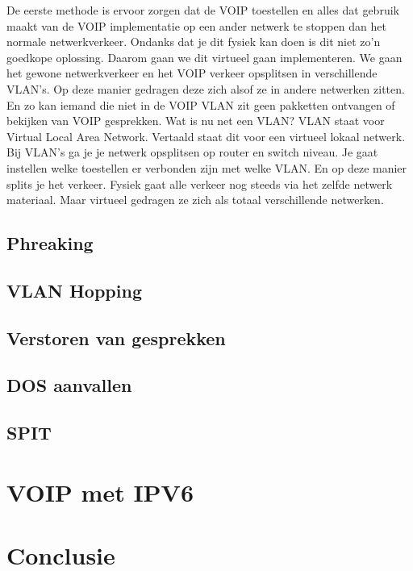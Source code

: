 \documentclass[pdftex,a4paper,12pt,twoside]{report}
\begin{document}
De eerste methode is ervoor zorgen dat de VOIP toestellen en alles dat gebruik maakt van de VOIP implementatie op een ander netwerk te stoppen dan het normale netwerkverkeer. Ondanks dat je dit fysiek kan doen is dit niet zo’n goedkope oplossing. Daarom gaan we dit virtueel gaan implementeren. We gaan het gewone netwerkverkeer en het VOIP verkeer opsplitsen in verschillende VLAN’s. Op deze manier gedragen deze zich alsof ze in andere netwerken zitten. En zo kan iemand die niet in de VOIP VLAN zit geen pakketten ontvangen of bekijken van VOIP gesprekken.
Wat is nu net een VLAN? VLAN staat voor Virtual Local Area Network. Vertaald staat dit voor een virtueel lokaal netwerk. Bij VLAN’s ga je je netwerk opsplitsen op router en switch niveau. Je gaat instellen welke toestellen er verbonden zijn met welke VLAN. En op deze manier splits je het verkeer. Fysiek gaat alle verkeer nog steeds via het zelfde netwerk materiaal. Maar virtueel gedragen ze zich als totaal verschillende netwerken. \\






\section{Phreaking}
\section{VLAN Hopping}
\section{Verstoren van gesprekken}
\section{DOS aanvallen}
\section{SPIT}

\chapter{VOIP met IPV6}
\label{ch:VOIP met IPV6}




\chapter{Conclusie}
\label{ch:conclusie}








\listoffigures
\listoftables
\end{document}
